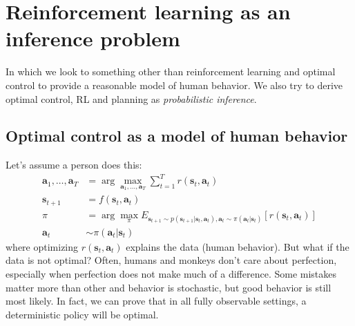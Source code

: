 \documentclass{report}
\newcommand{\argmax}{\arg\!\max}
\begin{document}
\section{Reinforcement learning as an inference problem}
In which we look to something other than reinforcement learning and optimal control to
provide a reasonable model of human behavior.
We also try to derive optimal control, RL and planning as \textit{probabilistic inference}.

\subsection{Optimal control as a model of human behavior}
Let's assume a person does this:
\begin{align}
\bm{a}_{1}, \dots, \bm{a}_{T} &= \argmax_{\bm{a}_{1}, \dots, \bm{a}_{T}} \sum_{t=1}^{T} r (\bm{s}_{t}, \bm{a}_{t} ) \\
\bm{s}_{t+1} &= f (\bm{s}_{t}, \bm{a}_{t} ) \\
\pi &= \argmax_{\pi} E_{ \bm{s}_{t+1} \sim p (\bm{s}_{t+1} | \bm{s}_{t}, \bm{a}_{t}), \bm{a}_{t} \sim \pi (\bm{a}_{t}| \bm{s}_{t} ) } \left[ r (\bm{s}_{t}, \bm{a}_{t} ) \right] \\
\bm{a}_{t} &\sim \pi (\bm{a}_{t}| \bm{s}_{t} )
\end{align}
where optimizing $ r (\bm{s}_{t}, \bm{a}_{t} )  $ explains the data  (human behavior).
But what if the data is not optimal? 
Often, humans and monkeys don't care about perfection, especially when perfection does not make
much of a difference.
Some mistakes matter more than other and behavior is stochastic, but good behavior is still most likely.
In fact, we can prove that in all fully observable settings, a deterministic policy will be optimal.
\end{document}
